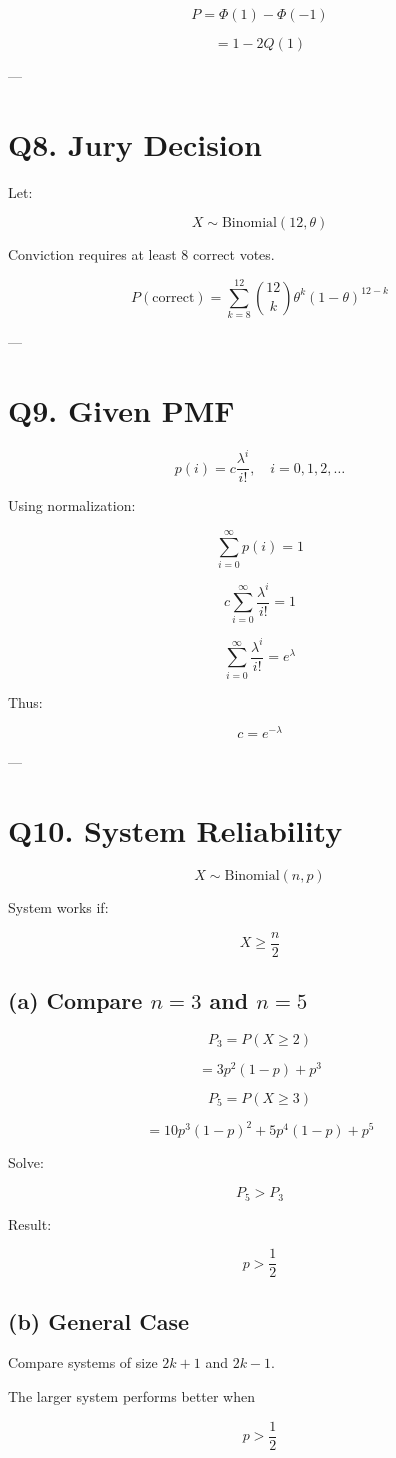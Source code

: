 \documentclass[12pt]{article}
\begin{document}
\[
P = \Phi(1) - \Phi(-1)
\]

\[
= 1 - 2Q(1)
\]

---
\newpage
\section*{Q8. Jury Decision}

Let:

\[
X \sim \text{Binomial}(12,\theta)
\]

Conviction requires at least 8 correct votes.

\[
P(\text{correct}) =
\sum_{k=8}^{12} {12 \choose k} \theta^k (1-\theta)^{12-k}
\]

---
\newpage
\section*{Q9. Given PMF}

\[
p(i) = c \frac{\lambda^i}{i!}, \quad i = 0,1,2,\dots
\]

Using normalization:

\[
\sum_{i=0}^{\infty} p(i) = 1
\]

\[
c \sum_{i=0}^{\infty} \frac{\lambda^i}{i!} = 1
\]

\[
\sum_{i=0}^{\infty} \frac{\lambda^i}{i!} = e^{\lambda}
\]

Thus:

\[
c = e^{-\lambda}
\]

---
\newpage
\section*{Q10. System Reliability}

\[
X \sim \text{Binomial}(n,p)
\]

System works if:

\[
X \ge \frac{n}{2}
\]

\subsection*{(a) Compare $n=3$ and $n=5$}

\[
P_3 = P(X \ge 2)
\]

\[
= 3p^2(1-p) + p^3
\]

\[
P_5 = P(X \ge 3)
\]

\[
= 10p^3(1-p)^2 + 5p^4(1-p) + p^5
\]

Solve:

\[
P_5 > P_3
\]

Result:

\[
p > \frac{1}{2}
\]

\subsection*{(b) General Case}

Compare systems of size $2k+1$ and $2k-1$.

The larger system performs better when

\[
p > \frac{1}{2}
\]
\end{document}
